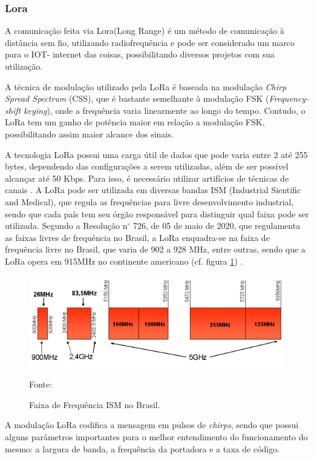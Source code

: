 \subsubsection{Lora}

\par A comunicação feita via Lora(Long Range) é um método de comunicação à distância sem fio, utilizando radiofrequência e pode ser considerado um marco para o IOT- internet das coisas, possibilitando diversos projetos com sua utilização.
\par A técnica de modulação utilizado pela LoRa é baseada na modulação \textit{Chirp Spread Spectrum} (CSS), que é bastante semelhante à modulação FSK (\textit{Frequency-shift keying}), onde a frequência varia linearmente ao longo do tempo. Contudo, o LoRa tem um ganho de potência maior em relação a modulação FSK, possibilitando assim maior alcance dos sinais.
\par 
A tecnologia LoRa possui uma carga útil de dados que pode varia entre 2 até 255 bytes, dependendo das configurações a serem utilizadas, além de ser possível alcançar até 50 Kbps. Para isso, é necessário  utilizar artifícios de técnicas de canais \cite{transmissaoLoRa}. A LoRa pode ser utilizada em diversas bandas ISM (Industrial Sientific and Medical), que regula as frequências para livre desenvolvimento industrial, sendo que cada país tem seu órgão responsável para distinguir qual faixa pode ser utilizada. Segundo a Resolução n$^{\circ}$ 726, de 05 de maio de 2020, que regulamenta as faixas livres de frequência no Brasil\cite{resolucao726}, a LoRa enquadra-se na faixa de frequência livre no Brasil, que varia de 902 a 928 MHz, entre outras, sendo que a LoRa opera em 915MHz no continente americano (cf. figura \ref{fig:Faixa de Frequência ISM}) .

\begin{figure}[!htb]
\centering
\includegraphics[scale=0.8]{figuras/faixas de frequencia .png}  
\caption{Faixa de Frequência ISM no Brasil.}
{\footnotesize Fonte:\cite{faixafreq}}
\label{fig:Faixa de Frequência ISM} %
\end{figure}
\par A modulação LoRa codifica a mensagem em pulsos de \textit{chirps}, sendo que possui alguns parâmetros importantes para o melhor entendimento do funcionamento do mesmo: a largura de banda, a frequência da portadora e a taxa de código\cite{desepenhoLoRa}.

